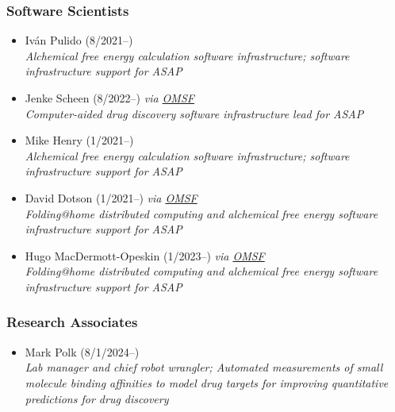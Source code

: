 \documentclass[10pt]{article}
\begin{document}
\subsubsection*{Software Scientists}

\begin{itemize}
  \item Iv\'{a}n Pulido (8/2021--)\\
  \emph{Alchemical free energy calculation software infrastructure; software infrastructure support for ASAP}

  \item Jenke Scheen (8/2022--) \emph{via \href{http://omsf.io}{OMSF}}\\
  \emph{Computer-aided drug discovery software infrastructure lead for ASAP}

  \item Mike Henry (1/2021--)\\
  \emph{Alchemical free energy calculation software infrastructure; software infrastructure support for ASAP}

  \item David Dotson (1/2021--) \emph{via \href{http://omsf.io}{OMSF}}\\
  \emph{Folding@home distributed computing and alchemical free energy software infrastructure support for ASAP}
  
  \item Hugo MacDermott-Opeskin (1/2023--) \emph{via \href{http://omsf.io}{OMSF}}\\
  \emph{Folding@home distributed computing and alchemical free energy software infrastructure support for ASAP}
  
\end{itemize}


\subsubsection*{Research Associates}

\begin{itemize}
  \item Mark Polk (8/1/2024--)\\
  \emph{Lab manager and chief robot wrangler; Automated measurements of small molecule binding affinities to model drug targets for improving quantitative predictions for drug discovery}

\end{itemize}
\end{document}
